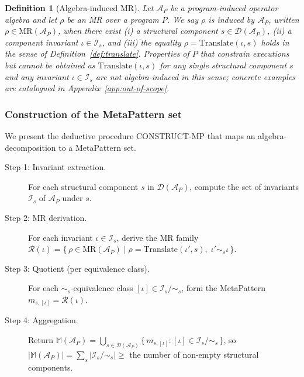 \documentclass[acmsmall,screen,review]{acmart}
\newtheorem{definition}{Definition}
\begin{document}
\begin{definition}[Algebra-induced MR]
\label{def:alg-induced}
Let $\mathcal{A}_P$ be a program-induced operator algebra and let $\rho$ be an MR over a program $P$. We say $\rho$ is \emph{induced by $\mathcal{A}_P$}, written $\rho \in \mathrm{MR}(\mathcal{A}_P)$, when there exist (i) a structural component $s \in \mathcal{D}(\mathcal{A}_P)$, (ii) a component invariant $\iota \in \mathcal{I}_s$, and (iii) the equality $\rho = \mathrm{Translate}(\iota, s)$ holds in the sense of Definition~\ref{def:translate}. Properties of $P$ that constrain executions but cannot be obtained as $\mathrm{Translate}(\iota, s)$ for any single structural component $s$ and any invariant $\iota \in \mathcal{I}_s$ are \emph{not} algebra-induced in this sense; concrete examples are catalogued in Appendix~\ref{app:out-of-scope}.
\end{definition}

\subsubsection{Construction of the MetaPattern set}

We present the deductive procedure CONSTRUCT-MP that maps an algebra-decomposition to a MetaPattern set.

\begin{description}
  \item[Step 1: Invariant extraction.] For each structural component $s$ in $\mathcal{D}(\mathcal{A}_P)$, compute the set of invariants $\mathcal{I}_s$ of $\mathcal{A}_P$ under $s$.
  \item[Step 2: MR derivation.] For each invariant $\iota \in \mathcal{I}_s$, derive the MR family $\mathcal{R}(\iota) = \{\,\rho \in \mathrm{MR}(\mathcal{A}_P) \mid \rho = \mathrm{Translate}(\iota', s),\; \iota' \sim_s \iota\,\}$.
  \item[Step 3: Quotient (per equivalence class).] For each $\sim_s$-equivalence class $[\iota] \in \mathcal{I}_s/\sim_s$, form the MetaPattern $m_{s,[\iota]} = \mathcal{R}(\iota)$.
  \item[Step 4: Aggregation.] Return $\mathbb{M}(\mathcal{A}_P) = \bigcup_{s \in \mathcal{D}(\mathcal{A}_P)} \{\, m_{s,[\iota]} : [\iota] \in \mathcal{I}_s/\sim_s \,\}$, so $|\mathbb{M}(\mathcal{A}_P)| = \sum_s |\mathcal{I}_s/\sim_s| \ge $ the number of non-empty structural components.
\end{description}
\end{document}
